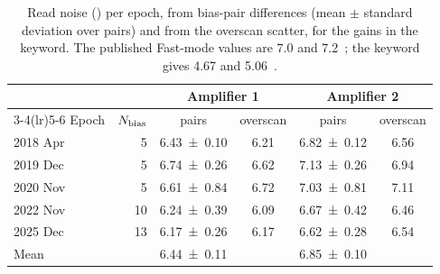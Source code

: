 \begin{table}[t]
  \centering\small
  \caption{Read noise (\si{\electron}) per epoch, from bias-pair differences
    (mean $\pm$ standard deviation over pairs) and from the overscan scatter, for
    the gains in the  keyword. The published Fast-mode values are 7.0
    and 7.2~\si{\electron}; the  keyword gives 4.67 and
    5.06~\si{\electron}.}
  \label{tab:ron}
  \begin{tabular}{lrcccc}
    \toprule
    & & \multicolumn{2}{c}{Amplifier 1} & \multicolumn{2}{c}{Amplifier 2} \\
    \cmidrule(lr){3-4}\cmidrule(lr){5-6}
    Epoch & $N_{\rm bias}$ & pairs & overscan & pairs & overscan \\
    \midrule
    2018 Apr & 5 & \num{6.43 \pm 0.10} & 6.21 & \num{6.82 \pm 0.12} & 6.56 \\
    2019 Dec & 5 & \num{6.74 \pm 0.26} & 6.62 & \num{7.13 \pm 0.26} & 6.94 \\
    2020 Nov & 5 & \num{6.61 \pm 0.84} & 6.72 & \num{7.03 \pm 0.81} & 7.11 \\
    2022 Nov & 10 & \num{6.24 \pm 0.39} & 6.09 & \num{6.67 \pm 0.42} & 6.46 \\
    2025 Dec & 13 & \num{6.17 \pm 0.26} & 6.17 & \num{6.62 \pm 0.28} & 6.54 \\
    \midrule
    Mean & & \num{6.44 \pm 0.11} & & \num{6.85 \pm 0.10} & \\
    \bottomrule
  \end{tabular}
\end{table}
